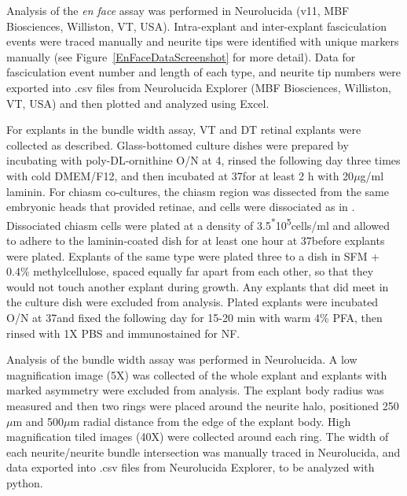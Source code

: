 Analysis of the \emph{en face} assay was performed in Neurolucida (v11, MBF Biosciences, Williston, VT, USA).
Intra-explant and inter-explant fasciculation events were traced manually and neurite tips were identified with unique markers manually (see Figure~\ref{EnFaceDataScreenshot} for more detail).
Data for fasciculation event number and length of each type, and neurite tip numbers were exported into .csv files from Neurolucida Explorer (MBF Biosciences, Williston, VT, USA) and then plotted and analyzed using Excel.

For explants in the bundle width assay, VT and DT retinal explants were collected as described.
Glass-bottomed culture dishes were prepared by incubating with poly-DL-ornithine O/N at 4\textcelsius, rinsed the following day three times with cold DMEM/F12, and then incubated at 37\textcelsius for at least 2 h with 20$\mu$g/ml laminin.
For chiasm co-cultures, the chiasm region was dissected from the same embryonic heads that provided retinae, and cells were dissociated as in .
Dissociated chiasm cells were plated at a density of 3.5\textsuperscript{*}10\textsuperscript{5}cells/ml and allowed to adhere to the laminin-coated dish for at least one hour at 37\textcelsius before explants were plated.
Explants of the same type were plated three to a dish in SFM + 0.4\% methylcellulose, spaced equally far apart from each other, so that they would not touch another explant during growth.
Any explants that did meet in the culture dish were excluded from analysis.
Plated explants were incubated O/N at 37\textcelsius and fixed the following day for 15-20 min with warm 4\% PFA, then rinsed with 1X PBS and immunostained for NF.

Analysis of the bundle width assay was performed in Neurolucida.
A low magnification image (5X) was collected of the whole explant and explants with marked asymmetry were excluded from analysis.
The explant body radius was measured and then two rings were placed around the neurite halo, positioned 250$\mu$m and 500$\mu$m radial distance from the edge of the explant body.
High magnification tiled images (40X) were collected around each ring.
The width of each neurite/neurite bundle intersection was manually traced in Neurolucida, and data exported into .csv files from Neurolucida Explorer, to be analyzed with python.

